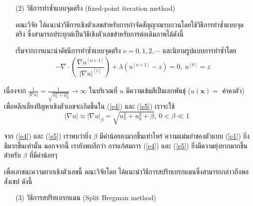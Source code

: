 \documentclass[hidelinks, a4paper,12pt]{article}
\numberwithin{equation}{section}							%
\numberwithin{equation}{section}
\begin{document}
{\begin{itemize}
	\item [(2)] วิธีการทำซ้ำแบบจุดตรึง (fixed-point iteration method)
	
	คณะวิจัย \cite{ref:FixpointSolver} ได้แนะนำวิธีการเชิงตัวเลขสำหรับการกำจัดสัญญาณรบกวนโดยใช้วิธีการทำซ้ำแบบจุดตรึง ซึ่งสามารถประยุกต์เป็นวิธีเชิงตัวเลขสำหรับการต่อเติมภาพได้ดังนี้
	
	\hspace{1cm} เริ่มจากการแนะนำดัชนีการทำซ้ำแบบจุดตรึง $\nu=0,1,2,\cdots$ และนิยามรูปแบบการทำซ้ำโดย
	\begin{align}
	- \nabla\cdot\left(\dfrac{\nabla u^{[\nu+1]}}{{| \nabla u |}^{[v]} }\right) + \lambda(u^{[\nu+1]}-z)  = 0,\ u^{[0]}=z
	\label{e5}
	\end{align}
\end{itemize}

\hspace{1cm} เนื่องจาก $\tfrac{1}{| \nabla u |}=\tfrac{1}{\sqrt{u_x^2+u_y^2}} \rightarrow \infty$ ในบริเวณที่ $u$ มีความเข้มสีเป็นเอกพันธ์ุ ($u(\mathbf{x})=$ ค่าคงตัว) เพื่อหลีกเลี่ยงปัญหาเชิงตัวเลขจะเกิดขึ้นใน (\ref{e4}) และ (\ref{e5}) เราจะใช้ 
\[
|\nabla u| \approx| \nabla u |_\beta=\sqrt{u_x^2+u_y^2+\beta},\ 0< \beta \ll 1
\] 

\hspace{1cm} จาก (\ref{e4}) และ (\ref{e5}) เราพบว่ายิ่ง $\beta$ มีค่าน้อยลงมากขึ้นเท่าไหร่ ความแม่นยำของตัวแบบ (\ref{e1}) ยิ่งมีมากขึ้นเท่านั้น นอกจากนี้ เรายังพบอีกว่า การแก้สมการ (\ref{e4}) และ (\ref{e5}) ยิ่งมีความยุ่งยากมากขึ้นสำหรับ $\beta$ ที่มีค่าน้อยๆ 

\hspace{1cm} เพื่อเอาชนะความยากเชิงตัวเลขนี้ คณะวิจัยโดย \cite{ref:splitbergman-inpaint} ได้แนะนำวิธีการสปริทเบรกแมนซึ่งสามารถกล่าวถึงพอสังเขป ดังนี้

\begin{itemize}
	\item [(3)] วิธีการสปริทเบรกแมน (Split Bregman method)
	

\end{itemize}}
\end{document}
